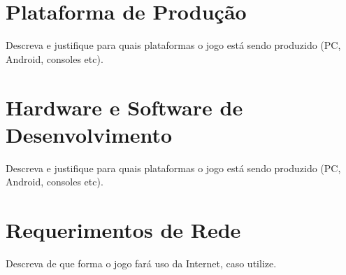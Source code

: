 
\section{Plataforma de Produção}

Descreva e justifique para quais plataformas o jogo está sendo produzido (PC, Android, consoles etc).

\section{Hardware e Software de Desenvolvimento}

Descreva e justifique para quais plataformas o jogo está sendo produzido (PC, Android, consoles etc).

\section{Requerimentos de Rede}

Descreva de que forma o jogo fará uso da Internet, caso utilize.